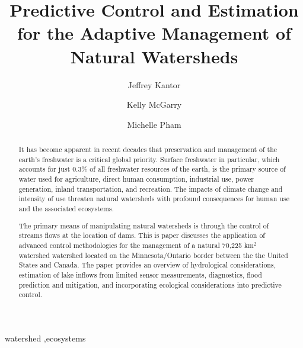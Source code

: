 \documentclass[preprint,times]{elsarticle}
\title{Predictive Control and Estimation for the Adaptive Management of Natural Watersheds}
\author{Jeffrey Kantor\corref{cor1}\fnref{fn1}}
\author{Kelly McGarry}
\author{Michelle Pham}
\begin{document}
\begin{abstract}
It has become apparent in recent decades that preservation and management of the earth's freshwater is a critical global priority. Surface freshwater in particular, which  accounts for just 0.3\% of all freshwater resources of the earth, is the primary source of water used for agriculture, direct human consumption, industrial use, power generation, inland transportation, and recreation. The impacts of climate change and intensity of use threaten natural watersheds with profound consequences for human use and the associated ecosystems. 

The primary means of manipulating natural watersheds is through the control of streams flows at the location of dams. This is paper discusses the application of advanced control methodologies for the management of a natural 70,225 km$^2$ watershed watershed located on the Minnesota/Ontario border between the the United States and Canada. The paper provides an overview of hydrological considerations, estimation of lake inflows from limited sensor measurements, diagnostics, flood prediction and mitigation, and incorporating ecological considerations into predictive control.
\end{abstract}

\begin{keyword}
watershed \sep ecosystems 
\end{keyword}

\maketitle
\end{document}
